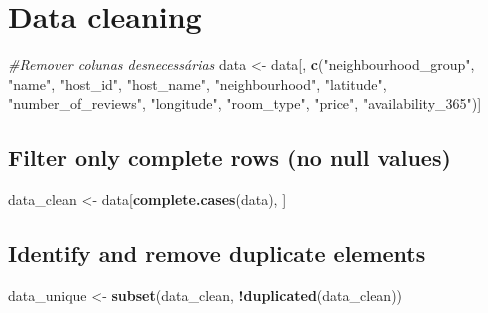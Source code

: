 \documentclass[
]{article}
\newenvironment{Shaded}{\begin{snugshade}}{\end{snugshade}}
\newcommand{\CommentTok}[1]{\textcolor[rgb]{0.56,0.35,0.01}{\textit{#1}}}
\newcommand{\FunctionTok}[1]{\textcolor[rgb]{0.13,0.29,0.53}{\textbf{#1}}}
\newcommand{\NormalTok}[1]{#1}
\newcommand{\OtherTok}[1]{\textcolor[rgb]{0.56,0.35,0.01}{#1}}
\newcommand{\SpecialCharTok}[1]{\textcolor[rgb]{0.81,0.36,0.00}{\textbf{#1}}}
\newcommand{\StringTok}[1]{\textcolor[rgb]{0.31,0.60,0.02}{#1}}
\begin{document}
\hypertarget{data-cleaning}{%
\section{Data cleaning}\label{data-cleaning}}

\begin{Shaded}
\begin{Highlighting}[]
\CommentTok{\#Remover colunas desnecessárias}
\NormalTok{data }\OtherTok{\textless{}{-}}\NormalTok{ data[, }\FunctionTok{c}\NormalTok{(}\StringTok{"neighbourhood\_group"}\NormalTok{, }\StringTok{"name"}\NormalTok{, }\StringTok{"host\_id"}\NormalTok{, }\StringTok{"host\_name"}\NormalTok{, }\StringTok{"neighbourhood"}\NormalTok{, }\StringTok{"latitude"}\NormalTok{, }\StringTok{"number\_of\_reviews"}\NormalTok{, }\StringTok{"longitude"}\NormalTok{, }\StringTok{"room\_type"}\NormalTok{, }\StringTok{"price"}\NormalTok{, }\StringTok{"availability\_365"}\NormalTok{)]}
\end{Highlighting}
\end{Shaded}

\hypertarget{filter-only-complete-rows-no-null-values}{%
\subsection{Filter only complete rows (no null
values)}\label{filter-only-complete-rows-no-null-values}}

\begin{Shaded}
\begin{Highlighting}[]
\NormalTok{data\_clean }\OtherTok{\textless{}{-}}\NormalTok{ data[}\FunctionTok{complete.cases}\NormalTok{(data), ]}
\end{Highlighting}
\end{Shaded}

\hypertarget{identify-and-remove-duplicate-elements}{%
\subsection{Identify and remove duplicate
elements}\label{identify-and-remove-duplicate-elements}}

\begin{Shaded}
\begin{Highlighting}[]
\NormalTok{data\_unique }\OtherTok{\textless{}{-}} \FunctionTok{subset}\NormalTok{(data\_clean, }\SpecialCharTok{!}\FunctionTok{duplicated}\NormalTok{(data\_clean))}
\end{Highlighting}
\end{Shaded}
\end{document}
